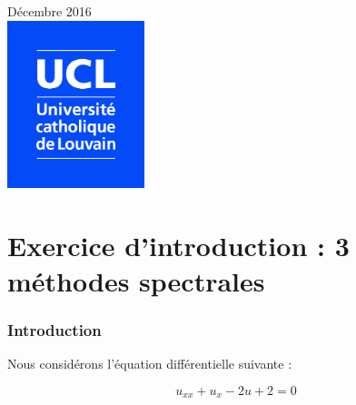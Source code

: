 \documentclass{report}
\begin{document}
\begin{titlepage}


{\large Décembre 2016}\\[1.5cm] %


\includegraphics[width=4cm]{Logo_UCL_SCIENCES.jpg}\\[1cm] %
 

\vfill %

\end{titlepage}


\part{Exercice d'introduction : 3 méthodes spectrales}

\section{Introduction}
Nous considérons l'équation différentielle suivante :

\begin{equation}\label{eq:main}
u_{xx} + u_x - 2u + 2= 0
\end{equation}
\end{document}
